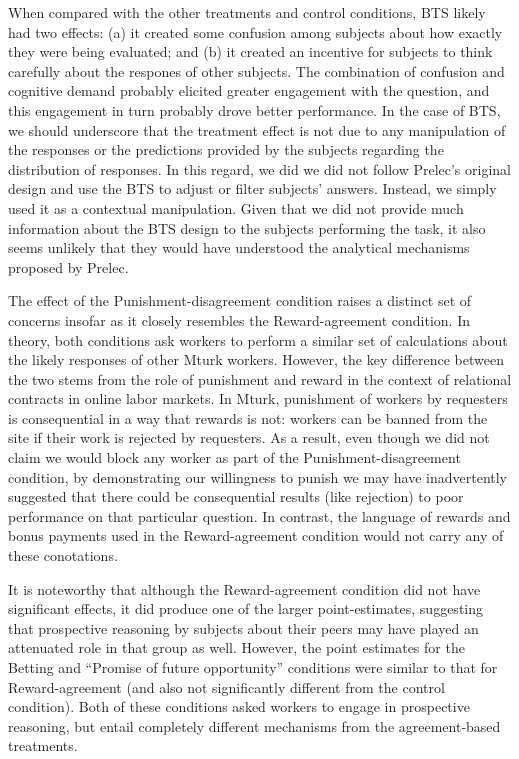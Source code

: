 \documentclass{cscw2010}
\begin{document}
When compared with the other treatments and control conditions, BTS
likely had two effects: (a) it created some confusion among subjects
about how exactly they were being evaluated; and (b) it created an
incentive for subjects to think carefully about the respones of other
subjects. The combination of confusion and cognitive demand probably
elicited greater engagement with the question, and this engagement in
turn probably drove better performance. In the case of BTS, we should
underscore that the treatment effect is not due to any manipulation of
the responses or the predictions provided by the subjects regarding the
distribution of responses. In this regard, we did we did not follow
Prelec's original design and use the BTS to adjust or filter subjects'
answers.\cite{prelec_bts_2004} Instead, we simply used it as a
contextual manipulation. Given that we did not provide much
information about the BTS design to the subjects performing the task,
it also seems unlikely that they would have understood the analytical
mechanisms proposed by Prelec.

The effect of the Punishment-disagreement condition raises a distinct
set of concerns insofar as it closely resembles the Reward-agreement
condition. In theory, both conditions ask workers to perform a similar
set of calculations about the likely responses of other Mturk
workers. However, the key difference between the two stems from the
role of punishment and reward in the context of relational contracts in
online labor markets. In Mturk, punishment of workers by requesters is
consequential in a way that rewards is not: workers can be banned from
the site if their work is rejected by requesters. As a result, even
though we did not claim we would block any worker as part of the
Punishment-disagreement condition, by demonstrating our willingness to punish 
we may have inadvertently suggested that there could be
consequential results (like rejection) to poor performance on that particular
question. In contrast, the language of rewards and bonus payments used
in the Reward-agreement condition would not carry any of these
conotations.
 
It is noteworthy that although the Reward-agreement condition did not
have significant effects, it did produce one of the larger
point-estimates, suggesting that prospective reasoning by
subjects about their peers may have played an attenuated role in that
group as well. However, the point estimates for the Betting
and ``Promise of future opportunity'' conditions were similar to that
for Reward-agreement (and also not significantly different from the
control condition). Both of these conditions asked workers to
engage in prospective reasoning, but entail completely different
mechanisms from the agreement-based treatments.
\end{document}
